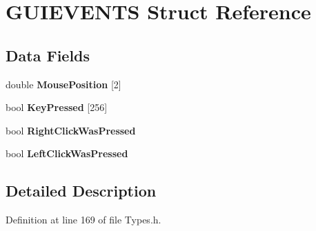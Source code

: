 \hypertarget{struct_g_u_i_e_v_e_n_t_s}{}\section{G\+U\+I\+E\+V\+E\+N\+TS Struct Reference}
\label{struct_g_u_i_e_v_e_n_t_s}
\subsection*{Data Fields}
\begin{DoxyCompactItemize}
\item 
double {\bfseries Mouse\+Position} \mbox{[}2\mbox{]}\hypertarget{struct_g_u_i_e_v_e_n_t_s_a43970005b3aad1aa4c02e0d4043d0cee}{}\label{struct_g_u_i_e_v_e_n_t_s_a43970005b3aad1aa4c02e0d4043d0cee}

\item 
bool {\bfseries Key\+Pressed} \mbox{[}256\mbox{]}\hypertarget{struct_g_u_i_e_v_e_n_t_s_a9ce1ca9dd931e80ddb093a561bb607d9}{}\label{struct_g_u_i_e_v_e_n_t_s_a9ce1ca9dd931e80ddb093a561bb607d9}

\item 
bool {\bfseries Right\+Click\+Was\+Pressed}\hypertarget{struct_g_u_i_e_v_e_n_t_s_a69e9249aae5d7d2333e1882fdac40615}{}\label{struct_g_u_i_e_v_e_n_t_s_a69e9249aae5d7d2333e1882fdac40615}

\item 
bool {\bfseries Left\+Click\+Was\+Pressed}\hypertarget{struct_g_u_i_e_v_e_n_t_s_a61e98cb8bce7c193d836acd09e933603}{}\label{struct_g_u_i_e_v_e_n_t_s_a61e98cb8bce7c193d836acd09e933603}

\end{DoxyCompactItemize}


\subsection{Detailed Description}


Definition at line 169 of file Types.\+h.


